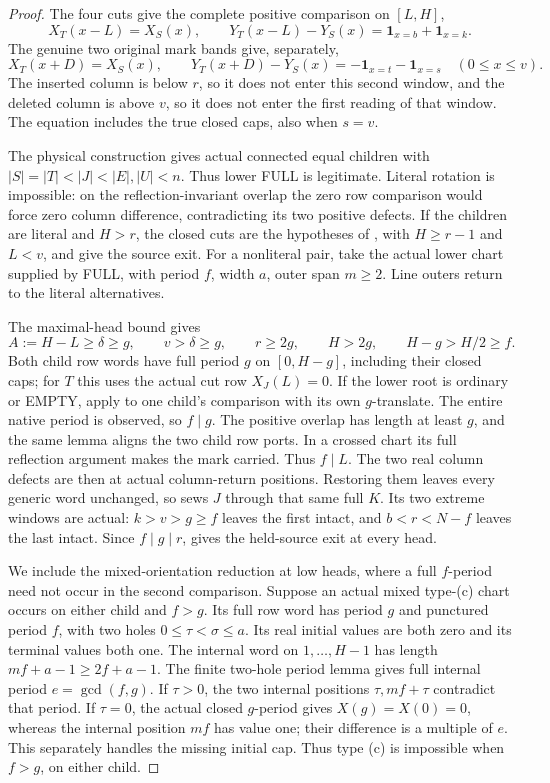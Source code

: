 \documentclass[11pt,a4paper]{amsart}
\numberwithin{equation}{section}
\theoremstyle{plain}
\theoremstyle{definition}
\newcommand{\one}{\mathbf1}
\begin{document}
\begin{proof}
The four cuts give the complete positive comparison on \([L,H]\),
\[
 X_T(x-L)=X_S(x),\qquad
 Y_T(x-L)-Y_S(x)=\one_{x=b}+\one_{x=k}.
\]
The genuine two original mark bands give, separately,
\[
 X_T(x+D)=X_S(x),\qquad
 Y_T(x+D)-Y_S(x)=-\one_{x=t}-\one_{x=s}
 \quad(0\le x\le v).
\]
The inserted column is below \(r\), so it does not enter this second
window, and the deleted column is above \(v\), so it does not enter
the first reading of that window.  The equation includes the true closed
caps, also when \(s=v\).

The physical construction gives actual connected equal children with
\(|S|=|T|<|J|<|E|,|U|<n\).  Thus lower FULL is legitimate.  Literal
rotation is impossible: on the reflection-invariant overlap the zero row
comparison would force zero column difference, contradicting its two
positive defects.  If the children are literal and \(H>r\), the
closed cuts are the hypotheses of , with
\(H\ge r-1\) and \(L<v\), and give the source exit.
For a nonliteral pair, take the actual lower chart supplied by FULL,
with period \(f\), width \(a\), outer span \(m\ge2\).
Line outers return to the literal alternatives.

The maximal-head bound gives
\[
 A:=H-L\ge\delta\ge g,\qquad v>\delta\ge g,\qquad
 r\ge2g,\qquad H>2g,\qquad H-g>H/2\ge f.
\]
Both child row words have full period \(g\) on \([0,H-g]\),
including their closed caps; for \(T\) this uses the actual cut row
\(X_J(L)=0\).  If the lower root is ordinary or EMPTY, apply
 to one child's comparison with its own
\(g\)-translate.  The entire native period is observed, so \(f\mid g\).
The positive overlap has length at least \(g\), and the same lemma
aligns the two child row ports.  In a crossed chart its full reflection
argument makes the mark carried.  Thus \(f\mid L\).  The two real
column defects are then at actual column-return positions.  Restoring
them leaves every generic word unchanged, so \cite[Recovery from the generic words]{Shields2026Gluing} sews
\(J\) through that same full \(K\).  Its two extreme windows are
actual: \(k>v>g\ge f\) leaves the first intact, and
\(b<r<N-f\) leaves the last intact.  Since \(f\mid g\mid r\),
 gives the held-source exit at every head.

We include the mixed-orientation reduction at low heads, where a full
\(f\)-period need not occur in the second comparison.  Suppose an
actual mixed type-(c) chart occurs on either child and \(f>g\).
Its full row word has period \(g\) and punctured period \(f\),
with two holes \(0\le\tau<\sigma\le a\).  Its real initial
values are both zero and its terminal values both one.  The internal
word on \(1,\ldots,H-1\) has length
\(mf+a-1\ge2f+a-1\).  The finite two-hole period lemma
\cite[Finite-period lemma, part (iii)]{Shields2026Gluing}
gives full internal period \(e=\gcd(f,g)\).  If \(\tau>0\),
the two internal positions \(\tau,mf+\tau\) contradict that
period.  If \(\tau=0\), the actual closed \(g\)-period gives
\(X(g)=X(0)=0\), whereas the internal position \(mf\) has value
one; their difference is a multiple of \(e\).  This separately
handles the missing initial cap.  Thus type (c) is impossible when
\(f>g\), on either child.


\end{proof}
\end{document}

